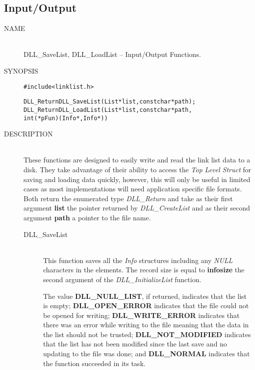 \documentclass[10pt,letterpaper,titlepage]{article}
\begin{document}
\pagebreak

\subsection{Input/Output}
\begin{description}
\item[NAME]\quad\\
DLL\_SaveList, DLL\_LoadList -- Input/Output Functions.

\item[SYNOPSIS]
\begin{alltt}

#include <linklist.h>

DLL_Return DLL_SaveList(List *list, const char *path);
DLL_Return DLL_LoadList(List *list, const char *path,
            int (*pFun)(Info *, Info *))
\end{alltt}

\item[DESCRIPTION]\quad\\
These functions are designed to easily write and read the link list data to a disk.  They take advantage of their ability to access the \emph{Top Level Struct} for saving and loading data quickly, however, this will only be useful in limited cases as most implementations will need application specific file formats.  Both return the enumerated type \emph{DLL\_Return} and take as their first argument \textbf{list} the pointer returned by \emph{DLL\_CreateList} and as their second argument \textbf{path} a pointer to the file name.

 \begin{description}
 \item[DLL\_SaveList]\quad\\
 This function saves all the \emph{Info} structures including any \emph{NULL} characters in the elements.  The record size is equal to \textbf{infosize} the second argument of the \emph{DLL\_InitializeList} function.
\vspace{8pt}

\noindent
  The value \textbf{DLL\_NULL\_LIST}, if returned, indicates that the list is empty; \textbf{DLL\_OPEN\_ERROR} indicates that the file could not be opened for writing; \textbf{DLL\_WRITE\_ERROR} indicates that there was an error while writing to the file meaning that the data in the list should not be trusted; \textbf{DLL\_NOT\_MODIFIED} indicates that the list has not been modified since the last save and no updating to the file was done; and \textbf{DLL\_NORMAL} indicates that the function succeeded in its task.


\end{description}
\end{description}
\end{document}
